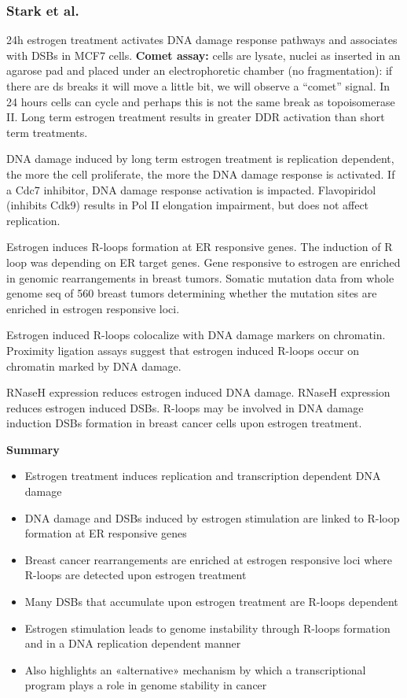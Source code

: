\hypertarget{stark-et-al.}{%
\subsubsection{Stark et al.}\label{stark-et-al.}}

24h estrogen treatment activates DNA damage response pathways and associates with DSBs in MCF7 cells. \textbf{Comet assay:} cells are lysate, nuclei as inserted in an agarose pad and placed under an electrophoretic chamber (no fragmentation): if there are ds breaks it will move a little bit, we will observe a ``comet'' signal. In 24 hours cells can cycle and perhaps this is not the same break as topoisomerase II. Long term estrogen treatment results in greater DDR activation than short term treatments.

DNA damage induced by long term estrogen treatment is replication dependent, the more the cell proliferate, the more the DNA damage response is activated. If a Cdc7 inhibitor, DNA damage response activation is impacted. Flavopiridol (inhibits Cdk9) results in Pol II elongation impairment, but does not affect replication.

Estrogen induces R-loops formation at ER responsive genes. The induction of R loop was depending on ER target genes. Gene responsive to estrogen are enriched in genomic rearrangements in breast tumors. Somatic mutation data from whole genome seq of 560 breast tumors determining whether the mutation sites are enriched in estrogen responsive loci.

Estrogen induced R-loops colocalize with DNA damage markers on chromatin. Proximity ligation assays suggest that estrogen induced R-loops occur on chromatin marked by DNA damage.

RNaseH expression reduces estrogen induced DNA damage. RNaseH expression reduces estrogen induced DSBs. R-loops may be involved in DNA damage induction DSBs formation in breast cancer cells upon estrogen treatment.

\textbf{Summary}

\begin{itemize}
\tightlist
\item
  Estrogen treatment induces replication and transcription dependent DNA damage
\item
  DNA damage and DSBs induced by estrogen stimulation are linked to R-loop formation at ER responsive genes
\item
  Breast cancer rearrangements are enriched at estrogen responsive loci where R-loops are detected upon estrogen treatment
\item
  Many DSBs that accumulate upon estrogen treatment are R-loops dependent
\item
  Estrogen stimulation leads to genome instability through R-loops formation and in a DNA
  replication dependent manner
\item
  Also highlights an «alternative» mechanism by which a transcriptional program plays a role in genome stability in cancer
\end{itemize}

